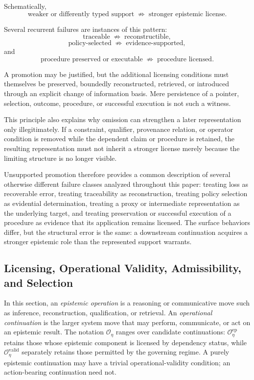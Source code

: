 \documentclass[11pt]{article}
\theoremstyle{definition}
\theoremstyle{remark}
\begin{document}
Schematically,
\[
\boxed{
\text{weaker or differently typed support}
\;\not\Rightarrow\;
\text{stronger epistemic license}.
}
\]

Several recurrent failures are instances of this pattern:
\[
\text{traceable}
\;\not\Rightarrow\;
\text{reconstructible},
\]
\[
\text{policy-selected}
\;\not\Rightarrow\;
\text{evidence-supported},
\]
and
\[
\text{procedure preserved or executable}
\;\not\Rightarrow\;
\text{procedure licensed}.
\]

A promotion may be justified, but the additional licensing conditions must themselves be preserved, boundedly reconstructed, retrieved, or introduced through an explicit change of information basis. Mere persistence of a pointer, selection, outcome, procedure, or successful execution is not such a witness.

This principle also explains why omission can strengthen a later representation only illegitimately. If a constraint, qualifier, provenance relation, or operator condition is removed while the dependent claim or procedure is retained, the resulting representation must not inherit a stronger license merely because the limiting structure is no longer visible.

Unsupported promotion therefore provides a common description of several otherwise different failure classes analyzed throughout this paper: treating loss as recoverable error, treating traceability as reconstruction, treating policy selection as evidential determination, treating a proxy or intermediate representation as the underlying target, and treating preservation or successful execution of a procedure as evidence that its application remains licensed. The surface behaviors differ, but the structural error is the same: a downstream continuation acquires a stronger epistemic role than the represented support warrants.

\subsection{Licensing, Operational Validity, Admissibility, and Selection}

In this section, an \emph{epistemic operation} is a reasoning or communicative move such as inference, reconstruction, qualification, or retrieval. An \emph{operational continuation} is the larger system move that may perform, communicate, or act on an epistemic result. The notation \(\mathcal O_{\eta}\) ranges over candidate continuations: \(\mathcal O^{\mathrm{ep}}_{\eta}\) retains those whose epistemic component is licensed by dependency status, while \(\mathcal O^{\mathrm{valid}}_{\eta}\) separately retains those permitted by the governing regime. A purely epistemic continuation may have a trivial operational-validity condition; an action-bearing continuation need not.
\end{document}
